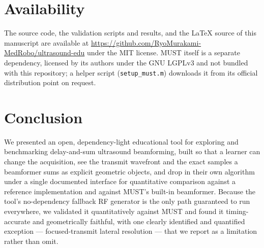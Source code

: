 \documentclass[11pt]{article}
\newcommand{\code}[1]{\texttt{#1}}
\newcommand{\must}{MUST}
\begin{document}
\section{Availability}

The source code, the validation scripts and results, and the \LaTeX{}
source of this manuscript are available at
\url{https://github.com/RyoMurakami-MedRobo/ultrasound-edu} under the MIT
license. \must{} itself is a separate dependency, licensed by its authors
under the GNU LGPLv3 and not bundled with this repository; a helper script
(\code{setup\_must.m}) downloads it from its official distribution point on
request.

\section{Conclusion}

We presented an open, dependency-light educational tool for exploring and
benchmarking delay-and-sum ultrasound beamforming, built so that a learner
can change the acquisition, see the transmit wavefront and the exact
samples a beamformer sums as explicit geometric objects, and drop in their
own algorithm under a single documented interface for quantitative
comparison against a reference implementation and against \must's built-in
beamformer. Because the tool's no-dependency fallback RF generator is the
only path guaranteed to run everywhere, we validated it quantitatively
against \must{} and found it timing-accurate and geometrically faithful,
with one clearly identified and quantified exception --- focused-transmit
lateral resolution --- that we report as a limitation rather than omit.



\end{document}
